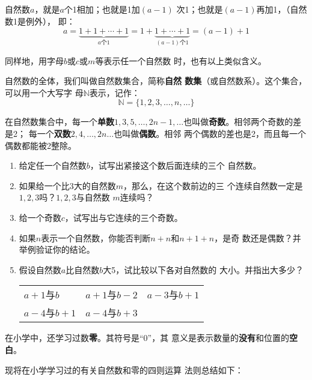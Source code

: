 自然数$a$，就是$a$个1相加；也就是1加$(a- 1)$
次1；也就是$(a-1)$再加1，（自然数1是例外），
即：
\[a=\underbrace{1+1+\cdots+1}_{a\text{个} 1}=1+\underbrace{1+\cdots+1}_{(a-1)\text{个} 1} = (a-1)+1\]

同样地，用字母$b$或$c$或$m$等表示任一个自然数
时，也有以上类似含义。

自然数的全体，我们叫做自然数集合，简称\textbf{自然
	数集}（或自然数系）。这个集合，可以用一个大写字
母$\mathbb{N}$表示，记作：
\[\mathbb{N}=\{1,2,3,\ldots,n,\ldots \} \]

在自然数集合中，每一个\textbf{单数}$1, 3, 5,\ldots, 2n-1,\ldots$也叫做\textbf{奇数}。相邻两个奇数的差是2；
每一个\textbf{双数}$2 ,  4 , \ldots,  2n\ldots$也叫做\textbf{偶数}。相邻
两个偶数的差也是2，而且每一个偶数都能被2整除。

\begin{ex}
	\begin{enumerate}
		\item  给定任一个自然数$b$，试写出紧接这个数后面连续的三个
		自然数。
		\item  如果给一个比3大的自然数$m$，那么，在这个数前边的三
		个连续自然数一定是$1,  2,  3$吗？$1,  2,  3$与自然数
		$m$连续吗？
		\item  给一个奇数$c$，试写出与它连续的三个奇数。
		\item  如果$n$表示一个自然数，你能否判断$n+n$和$n+1+n$，是奇
		数还是偶数？并举例验证你的结论。
		\item 假设自然数$a$比自然数$b$大5，试比较以下各对自然数的
		大小。并指出大多少？
		\begin{center}
			\begin{tabular}{p{.2\textwidth}p{}p{}}
				$a+1$与$b$&
				$a + 1$与$b-2$&
				$a-3$与$b + 1$\\
				$a-4$与$b+1$&
				$a-4$与$b+ 3$\\
			\end{tabular}
		\end{center}
		
	\end{enumerate}  
\end{ex}

在小学中，还学习过数\textbf{零}。其符号是“0”，其
意义是表示数量的\textbf{没有}和位置的\textbf{空白}。

现将在小学学习过的有关自然数和零的四则运算
法则总结如下：

